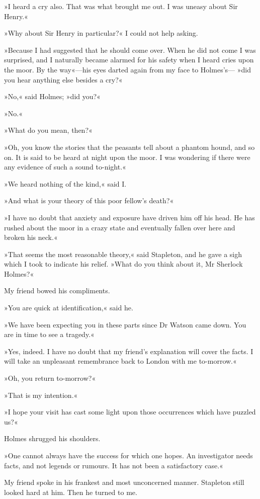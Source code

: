 »I heard a cry also. That was what brought me out. I was uneasy about Sir Henry.«

»Why about Sir Henry in particular?« I could not help asking.

»Because I had suggested that he should come over. When he did not come I was surprised, and I naturally became alarmed for his safety when I heard cries upon the moor. By the way«—his eyes darted again from my face to Holmes's— »did you hear anything else besides a cry?«

»No,« said Holmes; »did you?«

»No.«

»What do you mean, then?«

»Oh, you know the stories that the peasants tell about a phantom hound, and so on. It is said to be heard at night upon the moor. I was wondering if there were any evidence of such a sound to-night.«

»We heard nothing of the kind,« said I.

»And what is your theory of this poor fellow's death?«

»I have no doubt that anxiety and exposure have driven him off his head. He has rushed about the moor in a crazy state and eventually fallen over here and broken his neck.«

»That seems the most reasonable theory,« said Stapleton, and he gave a sigh which I took to indicate his relief. »What do you think about it, Mr Sherlock Holmes?«

My friend bowed his compliments.

»You are quick at identification,« said he.

»We have been expecting you in these parts since Dr Watson came down. You are in time to see a tragedy.«

»Yes, indeed. I have no doubt that my friend's explanation will cover the facts. I will take an unpleasant remembrance back to London with me to-morrow.«

»Oh, you return to-morrow?«

»That is my intention.«

»I hope your visit has cast some light upon those occurrences which have puzzled us?«

Holmes shrugged his shoulders.

»One cannot always have the success for which one hopes. An investigator needs facts, and not legends or rumours. It has not been a satisfactory case.«

My friend spoke in his frankest and most unconcerned manner. Stapleton still looked hard at him. Then he turned to me.

